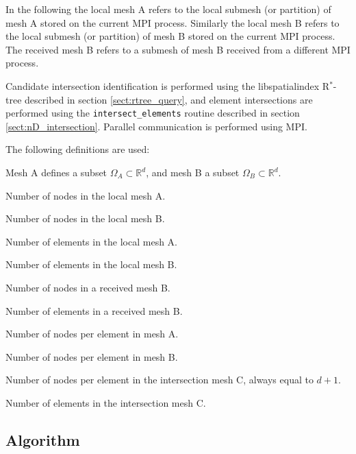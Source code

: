 \documentclass{article}
\begin{document}
In the following the local mesh A refers to the local submesh (or partition) of
mesh A stored on the current MPI process. Similarly the local mesh B refers to
the local submesh (or partition) of mesh B stored on the current MPI process.
The received mesh B refers to a submesh of mesh B received from a different MPI
process.

Candidate intersection identification is performed using the libspatialindex
R${}^*$-tree described in section \ref{sect:rtree_query}, and element
intersections are performed using the \verb+intersect_elements+ routine
described in section \ref{sect:nD_intersection}. Parallel communication is
performed using MPI.

The following definitions are used:
\begin{description}[leftmargin=\parindent,labelindent=\parindent]
  \item[$d$] Mesh A defines a subset $\Omega_A \subset \mathbb{R}^d$, and mesh B
    a subset $\Omega_B \subset \mathbb{R}^d$.
  \item[$V_A$] Number of nodes in the local mesh A.
  \item[$V_B$] Number of nodes in the local mesh B.
  \item[$E_A$] Number of elements in the local mesh A.
  \item[$E_B$] Number of elements in the local mesh B.
  \item[$V_B^*$] Number of nodes in a received mesh B.
  \item[$E_B^*$] Number of elements in a received mesh B.
  \item[$l_A$] Number of nodes per element in mesh A.
  \item[$l_B$] Number of nodes per element in mesh B.
  \item[$l_C$] Number of nodes per element in the intersection mesh C, always
               equal to $d + 1$.
  \item[$E_C$] Number of elements in the intersection mesh C.
\end{description}

\subsection{Algorithm}
\end{document}

